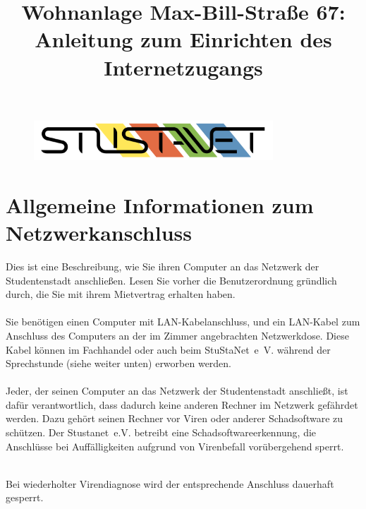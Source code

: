 \documentclass[a4paper,12pt]{scrartcl}
\title{Wohnanlage Max-Bill-Straße 67:\\
	Anleitung zum Einrichten des Internetzugangs}
\begin{document}
\maketitle

\begin{figure}[t!]
   \centering
   \vspace{-20pt}
   \includegraphics[width=0.8\textwidth,keepaspectratio]{Bilder/StuStaNet_Logo}
   \vspace{-40pt}
\end{figure}

\section*{Allgemeine Informationen zum Netzwerkanschluss}

Dies ist eine Beschreibung, wie Sie ihren Computer an das Netzwerk der Studentenstadt anschließen. Lesen Sie vorher die Benutzerordnung gründlich durch, die Sie mit ihrem Mietvertrag erhalten haben.
\\
\\
Sie benötigen einen Computer mit LAN-Kabelanschluss, und ein LAN-Kabel zum Anschluss des Computers an der im Zimmer angebrachten Netzwerkdose. Diese Kabel können im Fachhandel oder auch beim StuStaNet~e~V. während der Sprechstunde (siehe weiter unten) erworben werden.
\\
\\
Jeder, der seinen Computer an das Netzwerk der Studentenstadt anschließt, ist dafür verantwortlich, dass dadurch keine anderen Rechner im Netzwerk gefährdet werden. Dazu gehört seinen Rechner vor Viren oder anderer Schadsoftware zu schützen.
Der Stustanet~e.V. betreibt eine Schadsoftwareerkennung, die Anschlüsse bei Auffälligkeiten aufgrund von Virenbefall vorübergehend sperrt.
\\
\begin{bfseries}
	\\Bei wiederholter Virendiagnose wird der entsprechende Anschluss dauerhaft gesperrt.
\end{bfseries}




\end{document}
